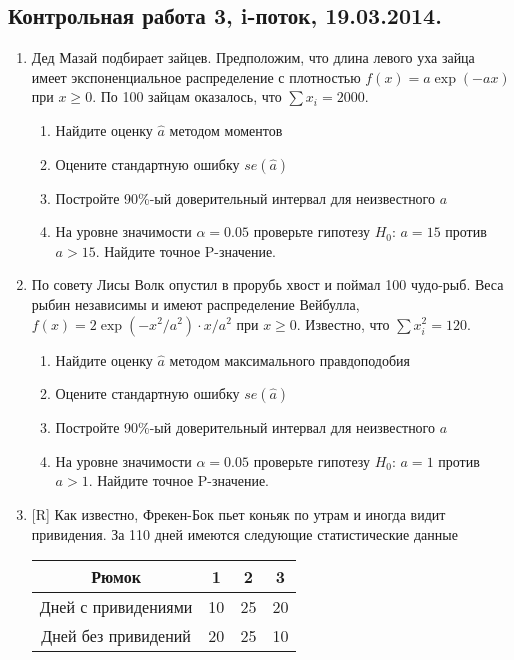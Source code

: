 \subsection{Контрольная работа 3, i-поток, 19.03.2014. }

\begin{enumerate}
\item Дед Мазай подбирает зайцев. Предположим, что длина левого уха зайца имеет экспоненциальное распределение с плотностью $f(x)=a\exp(-ax)$ при $x\geq 0$. По 100 зайцам оказалось, что $\sum x_i=2000$.
\begin{enumerate}
\item  Найдите оценку $\hat{a}$ методом моментов
\item Оцените стандартную ошибку $se(\hat{a})$
\item Постройте 90\%-ый доверительный интервал для неизвестного $a$
\item На уровне значимости $\alpha=0.05$ проверьте гипотезу $H_0$: $a=15$ против $a>15$. Найдите точное P-значение.
\end{enumerate}

\item По совету Лисы Волк опустил в прорубь хвост и поймал 100 чудо-рыб. Веса рыбин независимы и имеют распределение Вейбулла, $f(x)=2\exp(-x^2/a^2)\cdot x/a^2$ при $x\geq 0$. Известно, что $\sum x_i^2=120$.
\begin{enumerate}
\item  Найдите оценку $\hat{a}$ методом максимального правдоподобия
\item Оцените стандартную ошибку $se(\hat{a})$
\item Постройте 90\%-ый доверительный интервал для неизвестного $a$
\item На уровне значимости $\alpha=0.05$ проверьте гипотезу $H_0$: $a=1$ против $a>1$. Найдите точное P-значение.
\end{enumerate}


\item $[$R] Как известно, Фрекен-Бок пьет коньяк по утрам и иногда видит привидения. За 110 дней имеются следующие статистические данные


\begin{tabular}{c|ccc}
Рюмок & 1 & 2 & 3 \\
\hline
Дней с привидениями & 10 & 25 & 20 \\
Дней без привидений & 20 &  25 & 10 \\
\end{tabular}


\end{enumerate}

